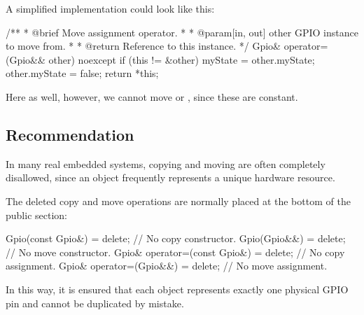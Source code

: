 \noindent A simplified implementation could look like this:

\begin{cppcode}
/**
 * @brief Move assignment operator.
 *
 * @param[in, out] other GPIO instance to move from.
 *
 * @return Reference to this instance.
 */
Gpio& operator=(Gpio&& other) noexcept
{
    if (this != &other)
    {
        myState       = other.myState;
        other.myState = false;
    }
    return *this;
}
\end{cppcode}

\noindent Here as well, however, we cannot move  or , since these are
constant.

\subsection{Recommendation}
\label{c2:sec:recommendation}
In many real embedded systems, copying and moving are often completely disallowed, since an object
frequently represents a unique hardware resource.

The deleted copy and move operations are normally placed at the bottom of the public section:

\begin{cppcode}
Gpio(const Gpio&)            = delete; // No copy constructor.
Gpio(Gpio&&)                 = delete; // No move constructor.
Gpio& operator=(const Gpio&) = delete; // No copy assignment.
Gpio& operator=(Gpio&&)      = delete; // No move assignment.
\end{cppcode}

\noindent In this way, it is ensured that each  object represents exactly one physical
GPIO pin and cannot be duplicated by mistake.
